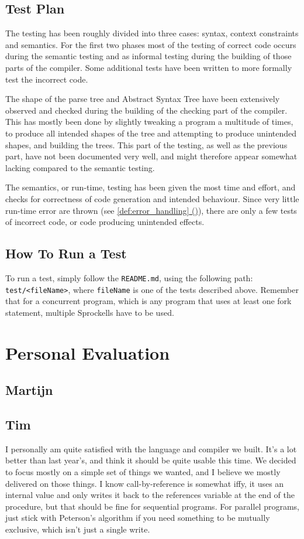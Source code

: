 \documentclass[twoside]{report}
\newcommand*{\fullref}[1]{\hyperref[{#1}]{\ref*{#1} (\nameref*{#1})}}
\begin{document}
\section{Test Plan}
The testing has been roughly divided into three cases: syntax, context constraints and semantics. For the first two phases most of the testing of correct code occurs during the semantic testing and as informal testing during the building of those parts of the compiler. Some additional tests have been written to more formally test the incorrect code.

The shape of the parse tree and Abstract Syntax Tree have been extensively observed and checked during the building of the checking part of the compiler. This has mostly been done by slightly tweaking a program a multitude of times, to produce all intended shapes of the tree and attempting to produce unintended shapes, and building the trees. This part of the testing, as well as the previous part, have not been documented very well, and might therefore appear somewhat lacking compared to the semantic testing.

The semantics, or run-time, testing has been given the most time and effort, and checks for correctness of code generation and intended behaviour. Since very little run-time error are thrown (see \fullref{def:error_handling}), there are only a few tests of incorrect code, or code producing unintended effects.


\section{How To Run a Test}
\label{how_to_run_a_test}
To run a test, simply follow the \texttt{README.md}, using the following path: \texttt{test/<fileName>}, where \texttt{fileName} is one of the tests described above. Remember that for a concurrent program, which is any program that uses at least one fork statement, multiple Sprockells have to be used.


\chapter{Personal Evaluation}
\label{personal_evaluation}
\section{Martijn}
\section{Tim}
I personally am quite satisfied with the language and compiler we built. It's a lot better than last year's, and think it should be quite usable this time. We decided to focus mostly on a simple set of things we wanted, and I believe we mostly delivered on those things. I know call-by-reference is somewhat iffy, it uses an internal value and only writes it back to the references variable at the end of the procedure, but that should be fine for sequential programs. For parallel programs, just stick with Peterson's algorithm if you need something to be mutually exclusive, which isn't just a single write.
\end{document}
